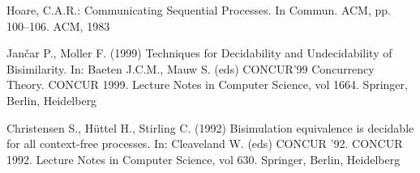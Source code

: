 \begin{thebibliography}{8}
  Hoare, C.A.R.: Communicating Sequential Processes. In Commun. ACM, pp. 100--106. ACM, 1983

  Jančar P., Moller F. (1999) Techniques for Decidability and Undecidability of Bisimilarity. In: Baeten J.C.M., Mauw S. (eds) CONCUR’99 Concurrency Theory. CONCUR 1999. Lecture Notes in Computer Science, vol 1664. Springer, Berlin, Heidelberg

  Christensen S., Hüttel H., Stirling C. (1992) Bisimulation equivalence is decidable for all context-free processes. In: Cleaveland W. (eds) CONCUR '92. CONCUR 1992. Lecture Notes in Computer Science, vol 630. Springer, Berlin, Heidelberg 

  


\end{thebibliography}


